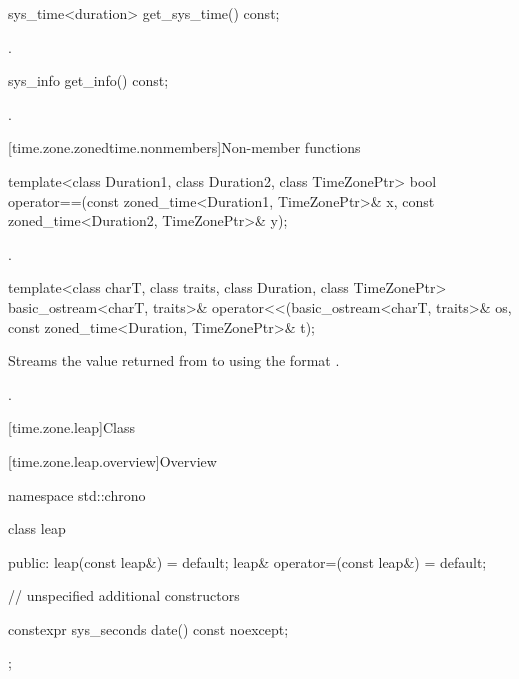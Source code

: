 %
\begin{itemdecl}
sys_time<duration> get_sys_time() const;
\end{itemdecl}

\begin{itemdescr}
\pnum
\returns
{}.
\end{itemdescr}

%
\begin{itemdecl}
sys_info get_info() const;
\end{itemdecl}

\begin{itemdescr}
\pnum
\returns
{}.
\end{itemdescr}

[time.zone.zonedtime.nonmembers]{Non-member functions}

%
\begin{itemdecl}
template<class Duration1, class Duration2, class TimeZonePtr>
  bool operator==(const zoned_time<Duration1, TimeZonePtr>& x,
                  const zoned_time<Duration2, TimeZonePtr>& y);
\end{itemdecl}

\begin{itemdescr}
\pnum
\returns
{}.
\end{itemdescr}

%
\begin{itemdecl}
template<class charT, class traits, class Duration, class TimeZonePtr>
  basic_ostream<charT, traits>&
    operator<<(basic_ostream<charT, traits>& os,
               const zoned_time<Duration, TimeZonePtr>& t);
\end{itemdecl}

\begin{itemdescr}
\pnum
\effects
Streams
the value returned from 
to 
using the format .

\pnum
\returns
{}.
\end{itemdescr}

[time.zone.leap]{Class }

[time.zone.leap.overview]{Overview}

\begin{codeblock}
namespace std::chrono {
  class leap {
  public:
    leap(const leap&)            = default;
    leap& operator=(const leap&) = default;

    // unspecified additional constructors

    constexpr sys_seconds date() const noexcept;
  };
}
\end{codeblock}

